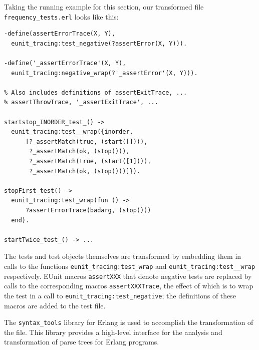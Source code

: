 \documentclass[]{sigplanconf}
\begin{document}
Taking the running example for this section, our transformed file \texttt{frequency\_tests.erl} looks like this:
\begin{verbatim}
-define(assertErrorTrace(X, Y),
  eunit_tracing:test_negative(?assertError(X, Y))).

-define('_assertErrorTrace'(X, Y),
  eunit_tracing:negative_wrap(?'_assertError'(X, Y))).
	
% Also includes definitions of assertExitTrace, ...
% assertThrowTrace, '_assertExitTrace', ...	

startstop_INORDER_test_() ->
  eunit_tracing:test__wrap({inorder,
      [?_assertMatch(true, (start([]))),
       ?_assertMatch(ok, (stop())),
       ?_assertMatch(true, (start([1]))),
       ?_assertMatch(ok, (stop()))]}).

stopFirst_test() ->
  eunit_tracing:test_wrap(fun () ->
      ?assertErrorTrace(badarg, (stop()))
  end).

startTwice_test_() -> ...
\end{verbatim}
The tests and test objects themselves are transformed by embedding them in calls to the functions \texttt{eunit\_tracing:test\_wrap} and  \texttt{eunit\_tracing:test\_\_wrap} respectively. EUnit macros \texttt{assertXXX} that denote negative tests are replaced by calls to the corresponding macros \texttt{assertXXXTrace}, the effect of which is to wrap the test in a call to \texttt{eunit\_tracing:test\_negative}; the definitions of these macros are added to the test file.  

The \texttt{syntax\_tools} library for Erlang is used to accomplish the transformation of the file. This library provides a high-level interface for the analysis and transformation of parse trees for Erlang programs.
\end{document}
